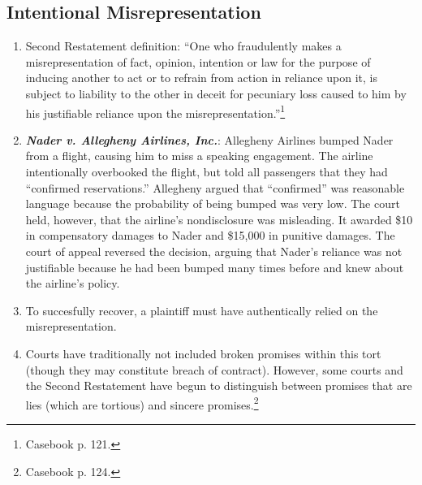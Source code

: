 \subsection{Intentional Misrepresentation}

\begin{enumerate}
    \item Second Restatement definition: ``One who fraudulently makes a misrepresentation of fact, opinion, intention or law for the purpose of inducing another to act or to refrain from action in reliance upon it, is subject to liability to the other in deceit for pecuniary loss caused to him by his justifiable reliance upon the misrepresentation.''\footnote{Casebook p. 121.}
    \item \textbf{\emph{Nader v. Allegheny Airlines, Inc.}}: Allegheny Airlines bumped Nader from a flight, causing him to miss a speaking engagement. The airline intentionally overbooked the flight, but told all passengers that they had ``confirmed reservations.'' Allegheny argued that ``confirmed'' was reasonable language because the probability of being bumped was very low. The court held, however, that the airline's nondisclosure was misleading. It awarded \$10 in compensatory damages to Nader and \$15,000 in punitive damages. The court of appeal reversed the decision, arguing that Nader's reliance was not justifiable because he had been bumped many times before and knew about the airline's policy.
    \item To succesfully recover, a plaintiff must have authentically relied on the misrepresentation.
    \item Courts have traditionally not included broken promises within this tort (though they may constitute breach of contract). However, some courts and the Second Restatement have begun to distinguish between promises that are lies (which are tortious) and sincere promises.\footnote{Casebook p. 124.}
\end{enumerate}

